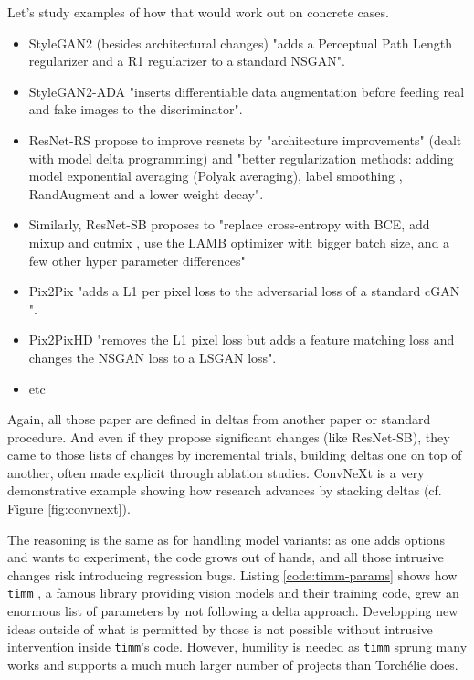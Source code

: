 Let's study examples of how that would work out on concrete cases.

\begin{itemize}
    \item StyleGAN2 \cite{stylegan2} (besides architectural changes) "adds a Perceptual Path Length regularizer and a R1 regularizer to a standard \ac{NSGAN}".
    \item StyleGAN2-ADA \cite{stylegan2ada} "inserts differentiable data augmentation before feeding real and fake images to the discriminator".
    \item ResNet-RS \cite{resnetrs} propose to improve resnets by "architecture improvements" (dealt with model delta programming) and "better regularization methods: adding model exponential averaging \cite{polyak} (Polyak averaging), label smoothing \cite{inceptionv2}, RandAugment \cite{randaugment} and a lower weight decay".
    \item Similarly, ResNet-SB proposes to "replace cross-entropy with \ac{BCE}, add mixup \cite{mixup} and cutmix \cite{cutmix}, use the LAMB optimizer \cite{lamb} with bigger batch size, and a few other hyper parameter differences"
    \item Pix2Pix \cite{pix2pix} "adds a L1 per pixel loss to the adversarial loss of a standard cGAN \cite{cgan}".
    \item Pix2PixHD \cite{pix2pixhd} "removes the L1 pixel loss but adds a feature matching loss and changes the \ac{NSGAN} loss to a \ac{LSGAN} loss".
    \item etc
\end{itemize}

Again, all those paper are defined in deltas from another paper or standard procedure. And even if they propose significant changes (like ResNet-SB), they came to those lists of changes by incremental trials, building deltas one on top of another, often made explicit through ablation studies. ConvNeXt \cite{convnext} is a very demonstrative example showing how research advances by stacking deltas (cf. Figure \ref{fig:convnext}).

The reasoning is the same as for handling model variants: as one adds options and wants to experiment, the code grows out of hands, and all those intrusive changes risk introducing regression bugs. Listing \ref{code:timm-params} shows how \texttt{timm} \cite{timm}, a famous library providing vision models and their training code, grew an enormous list of parameters by not following a delta approach. Developping new ideas outside of what is permitted by those is not possible without intrusive intervention inside \texttt{timm}'s code. However, humility is needed as \texttt{timm} sprung many works and supports a much much larger number of projects than Torchélie does.

